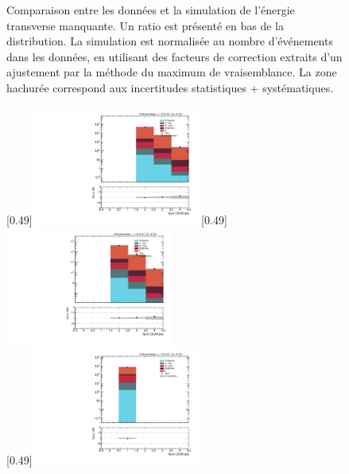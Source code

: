 \begin{figure}[p!]
    \caption{Comparaison entre les données et la simulation de l'énergie transverse manquante. Un ratio est présenté en bas de la distribution. La simulation est normalisée au nombre d'événements dans les données, en utilisant des facteurs de correction extraits d'un ajustement par la méthode du maximum de vraisemblance. La zone hachurée correspond aux incertitudes statistiques + systématiques.}
    \label{fig:higgs_data_mc_met}
\end{figure}

\begin{figure}[p!] \centering
    [0.49\textwidth]{\includegraphics[width=0.49\textwidth,angle=-90,origin=c]{annexes/figs/higgs/data_mc/2-btag/semimu/nBTaggedJets_reco_fullsel.pdf}} \hfill
    [0.49\textwidth]{\includegraphics[width=0.49\textwidth,angle=-90,origin=c]{annexes/figs/higgs/data_mc/2-btag/semie/nBTaggedJets_reco_fullsel.pdf}} \\ \vspace{5mm}
    [0.49\textwidth]{\includegraphics[width=0.49\textwidth,angle=-90,origin=c]{annexes/figs/higgs/data_mc/1-btag/semimu/nBTaggedJets_reco_fullsel.pdf}} \hfill

\end{figure}
